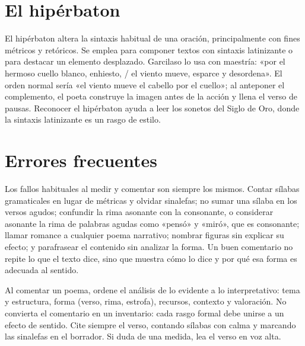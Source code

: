 \documentclass{book}
\begin{document}

\section{El hipérbaton}

El hipérbaton altera la sintaxis habitual de una oración, principalmente con fines métricos y retóricos. Se emplea para componer textos con sintaxis latinizante o para destacar un elemento desplazado. Garcilaso lo usa con maestría: «por el hermoso cuello blanco, enhiesto, / el viento mueve, esparce y desordena». El orden normal sería «el viento mueve el cabello por el cuello»; al anteponer el complemento, el poeta construye la imagen antes de la acción y llena el verso de pausas. Reconocer el hipérbaton ayuda a leer los sonetos del Siglo de Oro, donde la sintaxis latinizante es un rasgo de estilo.


\section{Errores frecuentes}

Los fallos habituales al medir y comentar son siempre los mismos. Contar sílabas gramaticales en lugar de métricas y olvidar sinalefas; no sumar una sílaba en los versos agudos; confundir la rima asonante con la consonante, o considerar asonante la rima de palabras agudas como «pensó» y «miró», que es consonante; llamar romance a cualquier poema narrativo; nombrar figuras sin explicar su efecto; y parafrasear el contenido sin analizar la forma. Un buen comentario no repite lo que el texto dice, sino que muestra cómo lo dice y por qué esa forma es adecuada al sentido.


\begin{tcolorbox}[title={Consejo}, studiumtip, breakable]

Al comentar un poema, ordene el análisis de lo evidente a lo interpretativo: tema y estructura, forma (verso, rima, estrofa), recursos, contexto y valoración. No convierta el comentario en un inventario: cada rasgo formal debe unirse a un efecto de sentido. Cite siempre el verso, contando sílabas con calma y marcando las sinalefas en el borrador. Si duda de una medida, lea el verso en voz alta.

\end{tcolorbox}
\end{document}
